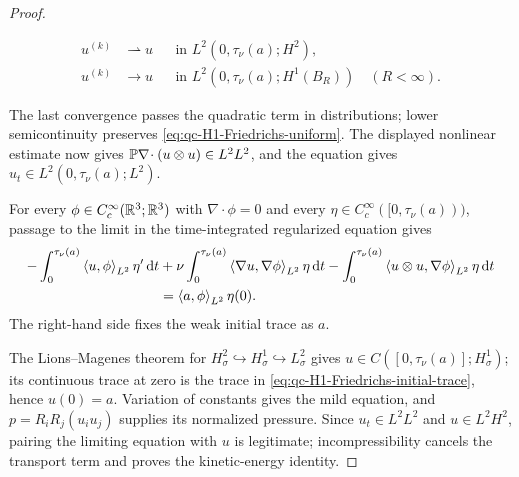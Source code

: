 \begin{proof}
\begin{samepage}
\begin{align*}
 u^{(k)}&\rightharpoonup u
 &&\text{in }L^2(0,\tau_\nu(a);H^2),\\
 u^{(k)}&\longrightarrow u
 &&\text{in }L^2(0,\tau_\nu(a);H^1(B_R))
 \quad(R<\infty).
\end{align*}
\par
\end{samepage}
The last convergence passes the quadratic term in distributions; lower
semicontinuity preserves \eqref{eq:qc-H1-Friedrichs-uniform}.  The displayed
nonlinear estimate now gives
\(\mathbb P\nabla\!\cdot(u\otimes u)\in L^2L^2\), and the equation gives
\(u_t\in L^2(0,\tau_\nu(a);L^2)\).
\begin{samepage}
For every
\(\phi\in C_c^\infty(\mathbb R^3;\mathbb R^3)\) with \(\nabla\cdot\phi=0\) and every
\(\eta\in C_c^\infty([0,\tau_\nu(a)))\), passage to the limit in the
time-integrated regularized equation gives
\begin{align}
 -\int_0^{\tau_\nu(a)}\left\langle u,\phi\right\rangle_{L^2}\eta'\,\mathrm d t
 &+\nu\int_0^{\tau_\nu(a)}\left\langle \nabla u,\nabla\phi\right\rangle_{L^2}\eta\,\mathrm d t
 -\int_0^{\tau_\nu(a)}\left\langle u\otimes u,\nabla\phi\right\rangle_{L^2}\eta\,\mathrm d t
 \notag\\
 &=\left\langle a,\phi\right\rangle_{L^2}\eta(0).
 \label{eq:qc-H1-Friedrichs-initial-trace}
\end{align}
The right-hand side fixes the weak initial trace as \(a\).
\par
\end{samepage}
The Lions--Magenes theorem \cite{LionsMagenes1972} for
\(H^2_\sigma\hookrightarrow H^1_\sigma\hookrightarrow L^2_\sigma\)
gives \(u\in C([0,\tau_\nu(a)];H^1_\sigma)\); its continuous trace at zero is
the trace in \eqref{eq:qc-H1-Friedrichs-initial-trace}, hence \(u(0)=a\).
Variation of constants gives the mild equation, and
\(p=R_iR_j(u_i u_j)\) supplies its normalized pressure.  Since
\(u_t\in L^2L^2\) and \(u\in L^2H^2\), pairing the limiting equation with
\(u\) is legitimate; incompressibility cancels the transport term and proves
the kinetic-energy identity.


\end{proof}
